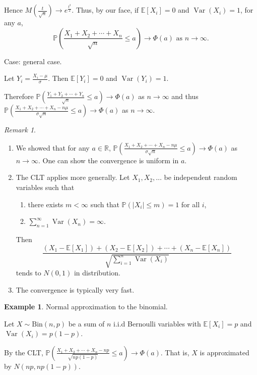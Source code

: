 \documentclass[a4paper,11pt]{amsbook}
\makeatletter
\renewenvironment{proof}[1][\proofname]{\par
    \pushQED{\qed}%
    \normalfont \topsep6\p@\@plus6\p@\relax
    \trivlist
    \itemindent\z@ %
    \item[\hskip\labelsep
          \scshape
      #1\@addpunct{.}]\ignorespaces
}{%
    \popQED\endtrivlist\@endpefalse
}
\theoremstyle{definition}
\newtheorem{example}{\hspace{-2em} \color{darkblue} Example}[chapter]
\theoremstyle{remark}
\newtheorem{remark}{\hspace{-2em} \color{darkblue} Remark}[chapter]
\newcommand{\R}{\mathbb{R}}
\newcommand{\E}{\mathbb{E}}
\renewcommand{\P}{\mathbb{P}}
\DeclareMathOperator\Var{Var}
\newcommand\0{\varnothing}
\newcommand\Bin{\text{Bin}}
\makeatother
\begin{document}
\begin{proof}
    Hence $M\left(\frac{t}{\sqrt{n}}\right)\to e^{\frac{t^2}{2}}$.
    Thus, by our face, if $\E[X_i]=0$ and $\Var(X_i)=1$, for any $a$, 
    $$\P\left(\frac{X_1+X_2+\cdots+X_n}{\sqrt{n}}\leq a\right)\to\Phi(a)\text{ as }n\to\infty.$$

    Case: general case.

    Let $Y_i=\frac{X_i-\mu}{\sigma}$. Then $\E[Y_i]=0$ and $\Var(Y_i)=1$.

    Therefore $\P\left(\frac{Y_1+Y_2+\cdots+Y_n}{\sqrt{n}}\leq a\right)\to\Phi(a)$ as $n\to\infty$
    and thus $\P\left(\frac{X_1+X_2+\cdots+X_n-n\mu}{\sigma\sqrt{n}}\leq a\right)\to\Phi(a)$ as $n\to\infty$.
\end{proof}

\begin{remark}
    \begin{enumerate}[label=(\arabic*)]
        \item We showed that for any $a\in\R$, $\P\left(\frac{X_1+X_2+\cdots+X_n-n\mu}{\sigma\sqrt{n}}\leq a\right)\to\Phi(a)$ as $n\to\infty$.
        One can show the convergence is uniform in $a$.
        \item The CLT applies more generally.
        Let $X_1,X_2,\ldots$ be independent random variables such that \begin{enumerate}[label=\arabic*.]
            \item there exists $m<\infty$ such that $\P(|X_i|\leq m)=1$ for all $i$,
            \item $\sum_{n=1}^\infty\Var(X_n)=\infty$.
        \end{enumerate}
        Then $$\frac{(X_1-\E[X_1])+(X_2-\E[X_2])+\cdots+(X_n-\E[X_n])}{\sqrt{\sum_{i=1}^n\Var(X_i)}}$$
        tends to $N(0,1)$ in distribution.
        \item The convergence is typically very fast.
    \end{enumerate}
\end{remark}

\begin{example} \label{nomral_approx}
    Normal approximation to the binomial.

    Let $X\sim\Bin(n,p)$ be a sum of $n$ i.i.d Bernoulli variables with $\E[X_i]=p$ and $\Var(X_i)=p(1-p)$.

    By the CLT, $\P\left(\frac{X_1+X_2+\cdots+X_n-np}{\sqrt{np(1-p)}}\leq a\right)\to\Phi(a)$.
    That is, $X$ is approximated by $N(np,np(1-p))$.
\end{example}
\end{document}
